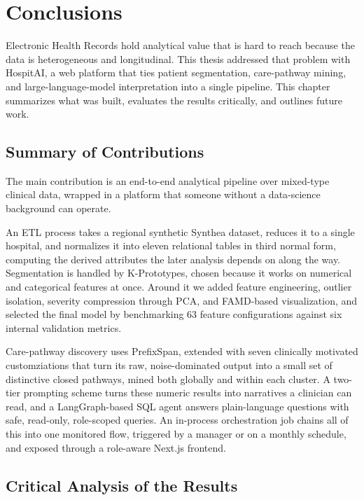 \chapter{Conclusions}
\label{ch:conclusions}
\pagestyle{fancy}

Electronic Health Records hold analytical value that is hard to reach because the data is heterogeneous and longitudinal. This thesis addressed that problem with HospitAI, a web platform that ties patient segmentation, care-pathway mining, and large-language-model interpretation into a single pipeline. This chapter summarizes what was built, evaluates the results critically, and outlines future work.

\section*{Summary of Contributions}

The main contribution is an end-to-end analytical pipeline over mixed-type clinical data, wrapped in a platform that someone without a data-science background can operate.

An ETL process takes a regional synthetic Synthea dataset, reduces it to a single hospital, and normalizes it into eleven relational tables in third normal form, computing the derived attributes the later analysis depends on along the way. Segmentation is handled by K-Prototypes, chosen because it works on numerical and categorical features at once. Around it we added feature engineering, outlier isolation, severity compression through PCA, and FAMD-based visualization, and selected the final model by benchmarking 63 feature configurations against six internal validation metrics.

Care-pathway discovery uses PrefixSpan, extended with seven clinically motivated customziations that turn its raw, noise-dominated output into a small set of distinctive closed pathways, mined both globally and within each cluster. A two-tier prompting scheme turns these numeric results into narratives a clinician can read, and a LangGraph-based SQL agent answers plain-language questions with safe, read-only, role-scoped queries. An in-process orchestration job chains all of this into one monitored flow, triggered by a manager or on a monthly schedule, and exposed through a role-aware Next.js frontend.

\section*{Critical Analysis of the Results}


